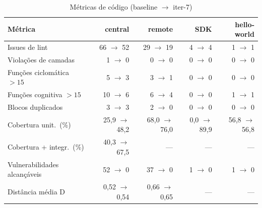 \begin{table}[htbp]
  \centering\small
  \caption{Métricas de código (baseline $\to$ iter-7)}
  \label{tab:metricas-antes-depois}
  \begin{tabular}{lrrrr}
    \toprule
    Métrica & central & remote & SDK & hello-world \\
    \midrule
    Issues de lint & 66 $\to$ 52 & 29 $\to$ 19 & 4 $\to$ 4 & 1 $\to$ 1 \\
    Violações de camadas & 1 $\to$ 0 & 0 $\to$ 0 & 0 $\to$ 0 & 0 $\to$ 0 \\
    Funções ciclomática $>15$ & 5 $\to$ 3 & 3 $\to$ 1 & 0 $\to$ 0 & 0 $\to$ 0 \\
    Funções cognitiva $>15$ & 10 $\to$ 6 & 6 $\to$ 4 & 0 $\to$ 0 & 1 $\to$ 1 \\
    Blocos duplicados & 3 $\to$ 3 & 2 $\to$ 0 & 0 $\to$ 0 & 0 $\to$ 0 \\
    Cobertura unit.\ (\%) & 25{,}9 $\to$ 48{,}2 & 68{,}0 $\to$ 76{,}0 & 0{,}0 $\to$ 89{,}9 & 56{,}8 $\to$ 56{,}8 \\
    Cobertura + integr.\ (\%) & 40{,}3 $\to$ 67{,}5 & --- & --- & --- \\
    Vulnerabilidades alcançáveis & 52 $\to$ 0 & 37 $\to$ 0 & 1 $\to$ 0 & 1 $\to$ 0 \\
    Distância média D & 0{,}52 $\to$ 0{,}54 & 0{,}66 $\to$ 0{,}65 & --- & --- \\
    \bottomrule
  \end{tabular}
\end{table}
